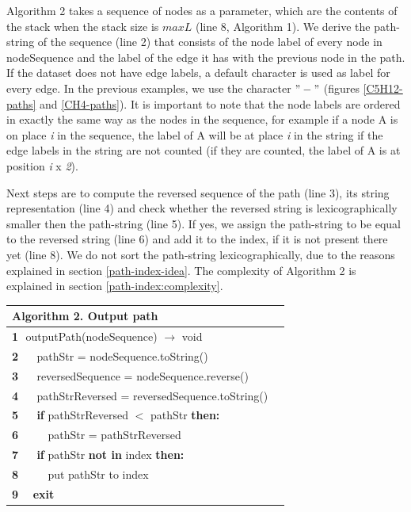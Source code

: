 \documentclass{l4proj}
\newcounter{example}[section]
\begin{document}
Algorithm 2 takes a sequence of nodes as a parameter, which are the contents of the stack when the stack size is $maxL$ (line 8, Algorithm 1). We derive the path-string of the sequence (line 2) that consists of the node label of every node in nodeSequence and the label of the edge it has with the previous node in the path. If the dataset does not have edge labels, a default character is used as label for every edge. In the previous examples, we use the character $"-"$ (figures \ref{C5H12-paths} and \ref{CH4-paths}). It is important to note that the node labels are ordered in exactly the same way as the nodes in the sequence, for example if a node A is on place \textit{i} in the sequence, the label of A will be at place \textit{i} in the string if the edge labels in the string are not counted (if they are counted, the label of A is at position \textit{i} x \textit{2}).\par
Next steps are to compute the reversed sequence of the path (line 3), its string representation (line 4) and check whether the reversed string is lexicographically smaller then the path-string (line 5). If yes, we assign the path-string to be equal to the reversed string (line 6) and add it to the index, if it is not present there yet (line 8). We do not sort the path-string lexicographically, due to the reasons explained in section \ref{path-index-idea}. The complexity of Algorithm 2 is explained in section \ref{path-index:complexity}.\par
\begin{table}[h]
 \centering
 \label{Algorithm 2.}
 \begin{tabular}{l l}
	\textbf{Algorithm 2.} Output path \\\hline
    \small\textbf{1} \,\,\small{outputPath(nodeSequence) $\rightarrow$ void}\\
     \small\textbf{2} \,\,\,\,\,\,\,\,\small{pathStr = nodeSequence.toString()}\\
    \small\textbf{3} \,\,\,\,\,\,\,\,\small{reversedSequence = nodeSequence.reverse()}\\
     \small\textbf{4} \,\,\,\,\,\,\,\,\small{pathStrReversed = reversedSequence.toString()}\\
    \small\textbf{5} \,\,\,\,\,\,\,\,\small{\textbf{if} pathStrReversed $<$ pathStr \textbf{then:}}\\
    \small\textbf{6} \,\,\,\,\,\,\,\,\,\,\,\,\,\,\small{pathStr = pathStrReversed}\\
    \small\textbf{7} \,\,\,\,\,\,\,\,\small{\textbf{if} pathStr \textbf{not in} index \textbf{then:}}\\
    \small\textbf{8} \,\,\,\,\,\,\,\,\,\,\,\,\,\,\small{put pathStr to index}\\
    \small\textbf{9}\,\,\,\,\,\,\,\,\small{\textbf{exit}}\\\hline
 \end{tabular}
\end{table}
\end{document}
